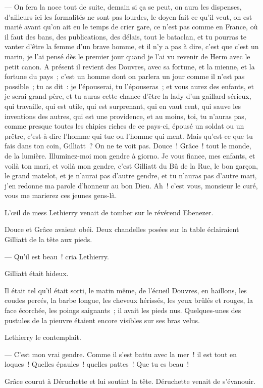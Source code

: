 \documentclass[french,twoside]{book} %
\begin{document}
— On fera la noce tout de suite, demain si ça se peut, on aura les dispenses, d’ailleurs ici les formalités ne sont pas lourdes, le doyen fait ce qu’il veut, on est marié avant qu’on ait eu le temps de crier gare, ce n’est pas comme en France, où il faut des bans, des publications, des délais, tout le bataclan, et tu pourras te vanter d’être la femme d’un brave homme, et il n’y a pas à dire, c’est que c’est un marin, je l’ai pensé dès le premier jour quand je l’ai vu revenir de Herm avec le petit canon. A présent il revient des Douvres, avec sa fortune, et la mienne, et la fortune du pays ; c’est un homme dont on parlera un jour comme il n’est pas possible ; tu as dit : je l’épouserai, tu l’épouseras ; et vous aurez des enfants, et je serai grand-père, et tu auras cette chance d’être la lady d’un gaillard sérieux, qui travaille, qui est utile, qui est surprenant, qui en vaut cent, qui sauve les inventions des autres, qui est une providence, et au moins, toi, tu n’auras pas, comme presque toutes les chipies riches de ce pays-ci, épousé un soldat ou un prêtre, c’est-à-dire l’homme qui tue ou l’homme qui ment. Mais qu’est-ce que tu fais dans ton coin, Gilliatt ? On ne te voit pas. Douce ! Grâce ! tout le monde, de la lumière. Illuminez-moi  mon gendre à giorno. Je vous fiance, mes enfants, et voilà ton mari, et voilà mon gendre, c’est Gilliatt du Bû de la Rue, le bon garçon, le grand matelot, et je n’aurai pas d’autre gendre, et tu n’auras pas d’autre mari, j’en redonne ma parole d’honneur au bon Dieu. Ah ! c’est vous, monsieur le curé, vous me marierez ces jeunes gens-là.\par
L’œil de mess Lethierry venait de tomber sur le révérend Ebenezer.\par
Douce et Grâce avaient obéi. Deux chandelles posées sur la table éclairaient Gilliatt de la tête aux pieds.\par
— Qu’il est beau ! cria Lethierry.\par
Gilliatt était hideux.\par
Il était tel qu’il était sorti, le matin même, de l’écueil Douvres, en haillons, les coudes percés, la barbe longue, les cheveux hérissés, les yeux brûlés et rouges, la face écorchée, les poings saignants ; il avait les pieds nus. Quelques-unes des pustules de la pieuvre étaient encore visibles sur ses bras velus.\par
Lethierry le contemplait.\par
— C’est mon vrai gendre. Comme il s’est battu avec la mer ! il est tout en loques ! Quelles épaules ! quelles pattes ! Que tu es beau !\par
Grâce courut à Déruchette et lui soutint la tête. Déruchette venait de s’évanouir.
\end{document}
